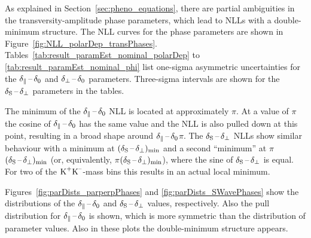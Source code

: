 As explained in Section~\ref{sec:pheno_equations}, there are partial ambiguities in the transversity-amplitude phase parameters, which lead
to NLLs with a double-minimum structure. The NLL curves for the phase parameters are shown in Figure~\ref{fig:NLL_polarDep_transPhases}.
Tables~\ref{tab:result_paramEst_nominal_polarDep} to \ref{tab:result_paramEst_nominal_phi} list one-sigma asymmetric uncertainties for the
$\delta_{\parallel\text{}}\,\text{--}\,\delta_\text{0}$ and $\delta_{\perp\text{}}\,\text{--}\,\delta_\text{0}$ parameters. Three-sigma intervals are shown for the $\delta_\text{S}\,\text{--}\,\delta_{\perp\text{}}$ parameters in the tables.

The minimum of the $\delta_{\parallel\text{}}\,\text{--}\,\delta_\text{0}$ NLL is located at approximately $\pi$. At a value of $\pi$ the cosine of
$\delta_{\parallel\text{}}\,\text{--}\,\delta_\text{0}$ has the same value and the NLL is also pulled down at this point, resulting in a broad shape around
$\delta_{\parallel\text{}}\,\text{--}\,\delta_\text{0}$\texteq$\pi$. The $\delta_\text{S}\,\text{--}\,\delta_{\perp\text{}}$ NLLs show similar behaviour with a minimum at $(\delta_\text{S}\,\text{--}\,\delta_{\perp\text{}})_\text{min}$ and a second ``minimum''
at $\pi$\textminus$(\delta_\text{S}\,\text{--}\,\delta_{\perp\text{}})_\text{min}$ (or, equivalently, \tm$\pi$\textminus$(\delta_\text{S}\,\text{--}\,\delta_{\perp\text{}})_\text{min}$), where the sine of $\delta_\text{S}\,\text{--}\,\delta_{\perp\text{}}$ is
equal. For two of the $\text{K}^\text{+}\text{K}^\text{--}$-mass bins this results in an actual local minimum.

Figures~\ref{fig:parDists_parperpPhases} and \ref{fig:parDists_SWavePhases} show the distributions of the $\delta_{\parallel\text{}}\,\text{--}\,\delta_\text{0}$ and $\delta_\text{S}\,\text{--}\,\delta_{\perp\text{}}$
values, respectively. Also the pull distribution for $\delta_{\parallel\text{}}\,\text{--}\,\delta_\text{0}$ is shown, which is more symmetric than the distribution of parameter
values. Also in these plots the double-minimum structure appears.
